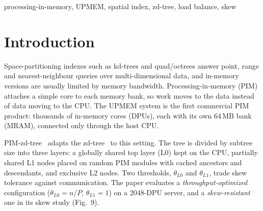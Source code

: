 \documentclass[conference]{IEEEtran}
\begin{document}
\begin{IEEEkeywords}
processing-in-memory, UPMEM, spatial index, zd-tree, load balance, skew
\end{IEEEkeywords}

\section{Introduction}

Space-partitioning indexes such as kd-trees and quad/octrees answer point, range and nearest-neighbour queries over
multi-dimensional data, and in-memory versions are usually limited by memory bandwidth. Processing-in-memory (PIM)
attaches a simple core to each memory bank, so work moves to the data instead of data moving to the CPU. The UPMEM
system is the first commercial PIM product: thousands of in-memory cores (DPUs), each with its own 64\,MB bank
(MRAM), connected only through the host CPU.

PIM-zd-tree~\cite{pimzdtree} adapts the zd-tree~\cite{zdtree} to this setting. The tree is divided by subtree size
into three layers: a globally shared top layer (L0) kept on the CPU, partially shared L1 nodes placed on random PIM
modules with cached ancestors and descendants, and exclusive L2 nodes. Two thresholds, $\theta_{L0}$ and
$\theta_{L1}$, trade skew tolerance against communication. The paper evaluates a \emph{throughput-optimized}
configuration ($\theta_{L0}=n/P$, $\theta_{L1}=1$) on a 2048-DPU server, and a \emph{skew-resistant} one in its
skew study (Fig.~9).
\end{document}
